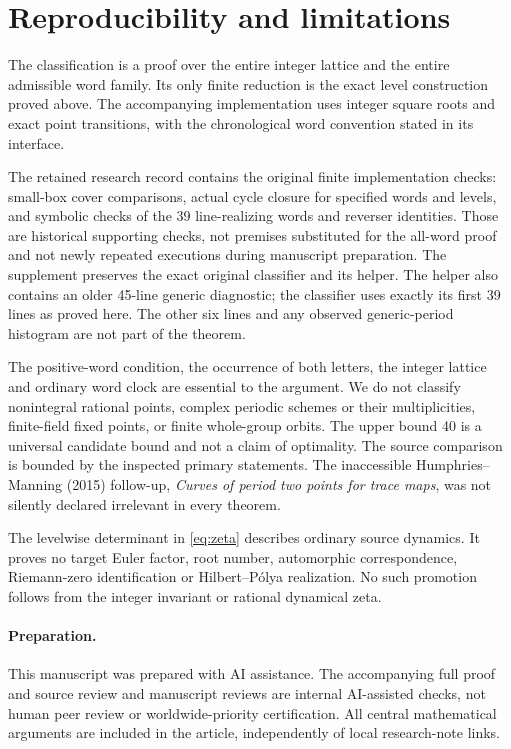 \section{Reproducibility and limitations}\label{sec:scope}

The classification is a proof over the entire integer
lattice and the entire admissible word family. Its only
finite reduction is the exact level construction proved
above. The accompanying implementation uses integer square
roots and exact point transitions, with the chronological
word convention stated in its interface.

The retained research record contains the original finite
implementation checks: small-box cover comparisons, actual
cycle closure for specified words and levels, and symbolic
checks of the 39 line-realizing words and reverser identities.
Those are historical supporting checks, not premises
substituted for the all-word proof and not newly repeated
executions during manuscript preparation. The supplement
preserves the exact original classifier and its helper.
The helper also contains an older 45-line generic diagnostic;
the classifier uses exactly its first 39 lines as proved
here. The other six lines and any observed generic-period
histogram are not part of the theorem.

The positive-word condition, the occurrence of both letters,
the integer lattice and ordinary word clock are essential
to the argument. We do not classify nonintegral rational
points, complex periodic schemes or their multiplicities,
finite-field fixed points, or finite whole-group orbits.
The upper bound 40 is a universal candidate bound and not
a claim of optimality. The source comparison is bounded
by the inspected primary statements. The inaccessible
Humphries--Manning (2015) follow-up, \emph{Curves of period
two points for trace maps}, was not silently declared
irrelevant in every theorem.

The levelwise determinant in \eqref{eq:zeta} describes
ordinary source dynamics. It proves no target Euler
factor, root number, automorphic correspondence,
Riemann-zero identification or Hilbert--P\'olya
realization. No such promotion follows from the
integer invariant or rational dynamical zeta.

\paragraph{Preparation.}
This manuscript was prepared with AI assistance. The
accompanying full proof and source review and manuscript
reviews are internal AI-assisted checks, not human
peer review or worldwide-priority certification.
All central mathematical arguments are included in
the article, independently of local research-note links.
